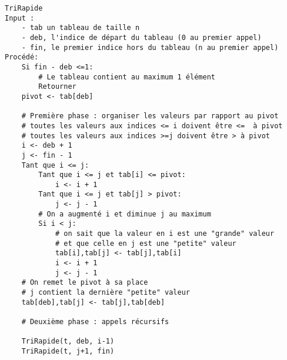 \documentclass{../cours}
\begin{document}
\begin{lstlisting}
TriRapide
Input :
    - tab un tableau de taille n
    - deb, l'indice de départ du tableau (0 au premier appel)
    - fin, le premier indice hors du tableau (n au premier appel)
Procédé:
    Si fin - deb <=1:
        # Le tableau contient au maximum 1 élément
        Retourner
    pivot <- tab[deb]
    
    # Première phase : organiser les valeurs par rapport au pivot
    # toutes les valeurs aux indices <= i doivent être <=  à pivot
    # toutes les valeurs aux indices >=j doivent être > à pivot
    i <- deb + 1 
    j <- fin - 1
    Tant que i <= j:
        Tant que i <= j et tab[i] <= pivot:
            i <- i + 1
        Tant que i <= j et tab[j] > pivot:
            j <- j - 1
        # On a augmenté i et diminue j au maximum
        Si i < j:
            # on sait que la valeur en i est une "grande" valeur 
            # et que celle en j est une "petite" valeur
            tab[i],tab[j] <- tab[j],tab[i]
            i <- i + 1
            j <- j - 1
    # On remet le pivot à sa place
    # j contient la dernière "petite" valeur
    tab[deb],tab[j] <- tab[j],tab[deb]
    
    # Deuxième phase : appels récursifs
    
    TriRapide(t, deb, i-1)
    TriRapide(t, j+1, fin)
\end{lstlisting}
\end{document}
